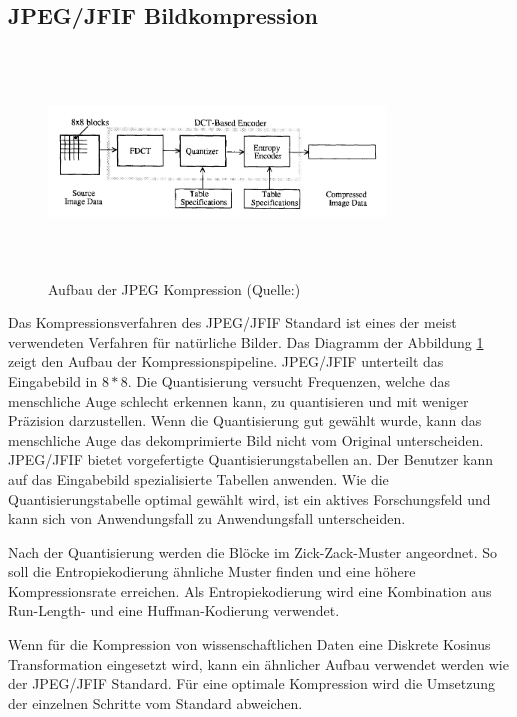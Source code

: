 \subsection{JPEG/JFIF Bildkompression}
\begin{figure}[!htbp]
	\center
	\includegraphics[width=0.8\textwidth,height=6cm,keepaspectratio]{./pictures/state/jpeg.png}
	\caption{Aufbau der JPEG Kompression (Quelle:\cite{wallace1992jpeg})}
	\label{state:jpeg:abb}
\end{figure}
Das Kompressionsverfahren des JPEG/JFIF Standard \cite{wallace1992jpeg} ist eines der meist verwendeten Verfahren für natürliche Bilder. Das Diagramm der Abbildung \ref{state:jpeg:abb} zeigt den Aufbau der Kompressionspipeline. JPEG/JFIF unterteilt das Eingabebild in $8*8$. Die Quantisierung versucht Frequenzen, welche das menschliche Auge schlecht erkennen kann, zu quantisieren und mit weniger Präzision darzustellen. Wenn die Quantisierung gut gewählt wurde, kann das menschliche Auge das dekomprimierte Bild nicht vom Original unterscheiden. JPEG/JFIF bietet vorgefertigte Quantisierungstabellen an. Der Benutzer kann auf das Eingabebild spezialisierte Tabellen anwenden. Wie die Quantisierungstabelle optimal gewählt wird, ist ein aktives Forschungsfeld \cite{wu1993rate:jpeg} \cite{wang2001designing:jpeg} und kann sich von Anwendungsfall zu Anwendungsfall unterscheiden.

Nach der Quantisierung werden die Blöcke im Zick-Zack-Muster \cite{wallace1992jpeg} angeordnet. So soll die Entropiekodierung ähnliche Muster finden und eine höhere Kompressionsrate erreichen. Als Entropiekodierung wird eine Kombination aus Run-Length- \cite{wiki:rle} und eine Huffman-Kodierung \cite{huffman1952method} verwendet.

Wenn für die Kompression von wissenschaftlichen Daten eine Diskrete Kosinus Transformation eingesetzt wird, kann ein ähnlicher Aufbau verwendet werden wie der JPEG/JFIF Standard. Für eine optimale Kompression wird die Umsetzung der einzelnen Schritte vom Standard abweichen.

